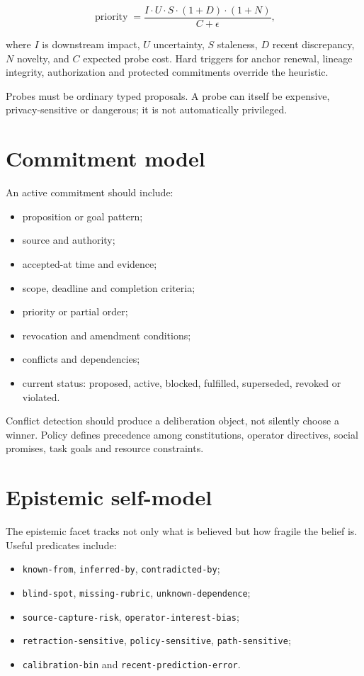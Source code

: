 \documentclass[11pt,oneside]{report}
\begin{document}
\[
\operatorname{priority} =
\frac{
I\cdot U\cdot S\cdot (1+D)\cdot (1+N)
}{C+\epsilon},
\]

where $I$ is downstream impact, $U$ uncertainty, $S$ staleness, $D$ recent discrepancy, $N$ novelty, and $C$ expected probe cost. Hard triggers for anchor renewal, lineage integrity, authorization and protected commitments override the heuristic.

Probes must be ordinary typed proposals. A probe can itself be expensive, privacy-sensitive or dangerous; it is not automatically privileged.

\section{Commitment model}

An active commitment should include:

\begin{itemize}
  \item proposition or goal pattern;
  \item source and authority;
  \item accepted-at time and evidence;
  \item scope, deadline and completion criteria;
  \item priority or partial order;
  \item revocation and amendment conditions;
  \item conflicts and dependencies;
  \item current status: proposed, active, blocked, fulfilled, superseded, revoked or violated.
\end{itemize}

Conflict detection should produce a deliberation object, not silently choose a winner. Policy defines precedence among constitutions, operator directives, social promises, task goals and resource constraints.

\section{Epistemic self-model}

The epistemic facet tracks not only what is believed but how fragile the belief is. Useful predicates include:

\begin{itemize}
  \item \texttt{known-from}, \texttt{inferred-by}, \texttt{contradicted-by};
  \item \texttt{blind-spot}, \texttt{missing-rubric}, \texttt{unknown-dependence};
  \item \texttt{source-capture-risk}, \texttt{operator-interest-bias};
  \item \texttt{retraction-sensitive}, \texttt{policy-sensitive}, \texttt{path-sensitive};
  \item \texttt{calibration-bin} and \texttt{recent-prediction-error}.
\end{itemize}
\end{document}
